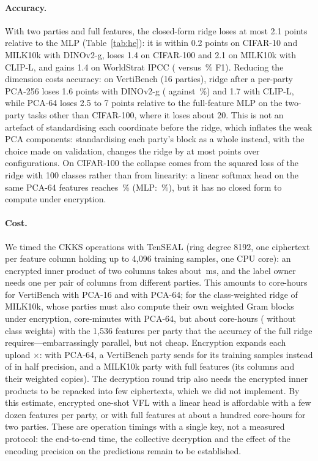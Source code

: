 \paragraph{Accuracy.}
With two parties and full features, the closed-form ridge loses at most 2.1 points relative to the MLP (Table~\ref{tab:he}): it is within 0.2 points on CIFAR-10 and MILK10k with DINOv2-g, loses 1.4 on CIFAR-100 and 2.1 on MILK10k with CLIP-L, and gains 1.4 on WorldStrat IPCC (\heworldstratipccRidgeFull{} versus \heworldstratipccMlp\,\% F1). Reducing the dimension costs accuracy: on VertiBench (16 parties), ridge after a per-party PCA-256 loses 1.6 points with DINOv2-g (\heVbGRidgeTf{} against \heVbGMlp\,\%) and 1.7 with CLIP-L, while PCA-64 loses 2.5 to 7 points relative to the full-feature MLP on the two-party tasks other than CIFAR-100, where it loses about 20. This is not an artefact of standardising each coordinate before the ridge, which inflates the weak PCA components: standardising each party's block as a whole instead, with the choice made on validation, changes the ridge by at most \heSelMax{} points over \heSelN{} configurations. On CIFAR-100 the collapse comes from the squared loss of the ridge with 100 classes rather than from linearity: a linear softmax head on the same PCA-64 features reaches \heCHundredSfLin\,\% (MLP: \heCHundredSfMlp\,\%), but it has no closed form to compute under encryption.

\paragraph{Cost.}
We timed the CKKS operations with TenSEAL (ring degree 8192, one ciphertext per feature column holding up to 4{,}096 training samples, one CPU core): an encrypted inner product of two columns takes about \hcVbStCtCt\,ms, and the label owner needs one per pair of columns from different parties. This amounts to \hcVbStServerH{} core-hours for VertiBench with PCA-16 and \hcVbSfServerH{} with PCA-64; for the class-weighted ridge of MILK10k, whose parties must also compute their own weighted Gram blocks under encryption, \hcMilkServer{} core-minutes with PCA-64, but about \hcMilkFullH{} core-hours (\hcMilkFullUnwH{} without class weights) with the 1{,}536 features per party that the accuracy of the full ridge requires---embarrassingly parallel, but not cheap. Encryption expands each upload $\times$\hcVbSfExpand: with PCA-64, a VertiBench party sends \hcVbSfUp{} for its \hcVbSfN{} training samples instead of \hcVbSfPlain{} in half precision, and a MILK10k party with full features \hcMilkFullUp{} (its columns and their weighted copies). The decryption round trip also needs the encrypted inner products to be repacked into few ciphertexts, which we did not implement. By this estimate, encrypted one-shot VFL with a linear head is affordable with a few dozen features per party, or with full features at about a hundred core-hours for two parties. These are operation timings with a single key, not a measured protocol: the end-to-end time, the collective decryption and the effect of the encoding precision on the predictions remain to be established.

